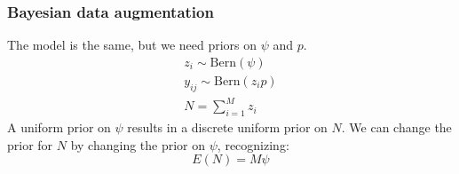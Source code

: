 \documentclass[color=usenames,dvipsnames]{beamer}\usepackage[]{graphicx}\usepackage[]{color}
\begin{document}
\begin{frame}
  \frametitle{Bayesian data augmentation}
  The model is the same, but we need priors on $\psi$ and $p$. 
  \begin{gather*}
    z_i \sim \mathrm{Bern}(\psi) \\
    y_{ij} \sim \mathrm{Bern}(z_ip) \\
    N = \sum_{i=1}^M z_i
  \end{gather*}
  \vfill
  A uniform prior on $\psi$ results in a discrete uniform prior on
  $N$. We can change the prior for $N$ by changing the prior on  
  $\psi$, recognizing:
  \[
    E(N)=M\psi
  \]
\end{frame}














\end{document}
